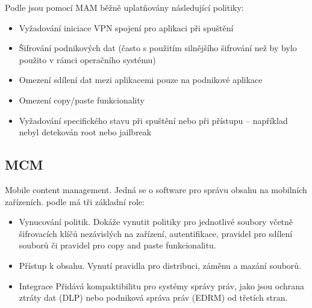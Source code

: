  Podle \cite{Gartner_EMM_2016} jsou pomocí MAM běžně uplatňovány následující politiky:
 \begin{itemize}
     \item Vyžadování iniciace VPN spojení pro aplikaci při spuštění
     \item Šifrování podnikových dat (často s použitím silnějšího šifrování než by bylo použito v rámci operačního systému)
     \item Omezení sdílení dat mezi aplikacemi pouze na podnikové aplikace
     \item Omezení copy/paste funkcionality
     \item Vyžadování specifického stavu při spuštění nebo při přístupu -- například nebyl detekován root nebo jailbreak
 \end{itemize}
 
  


\subsection{MCM} 
Mobile content management. Jedná se o software pro správu obsahu na mobilních zařízeních. podle \cite{Gartner_EMM_2016} má tři základní role:
\begin{itemize}
    \item Vynucování politik. Dokáže vynutit politiky pro jednotlivé soubory včetně šifrovacích klíčů nezávislých na zařízení, autentifikace, pravidel pro sdílení souborů či pravidel pro copy and paste funkcionalitu.
    \item Přístup k obsahu. Vynutí pravidla pro distribuci, záměnu a mazání souborů.
    \item Integrace Přidává kompaktibilitu pro systémy správy práv, jako jsou ochrana ztráty dat (DLP) nebo podniková správa práv (EDRM) od třetích stran.
\end{itemize}
 

